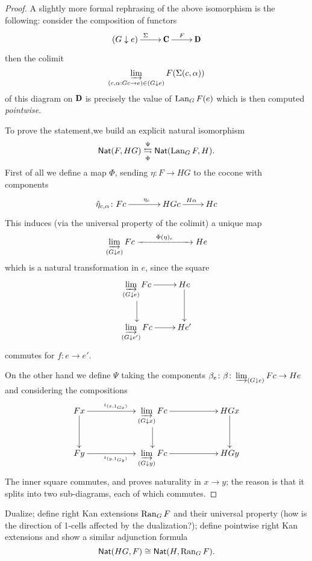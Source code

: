 \documentclass[a4paper,12pt]{amsart}
\begin{document}
\begin{proof}
A slightly more formal rephrasing of the above isomorphism is the following: consider the composition of functors
\[
\xymatrix{
	(G\downarrow e) \ar[r]^\Sigma & \C \ar[r]^F & \D
}
\]
then the colimit
\[
\varinjlim_{(c, \alpha : Gc \to e)\in(G\downarrow e)} F(\Sigma(c, \alpha))
\]
of this diagram on $\D$ is precisely the value of $\operatorname{Lan}_GF(e)$ which is then computed \emph{pointwise}.

To prove the statement,we build an explicit natural isomorphism
\[
\textsf{Nat}(F,HG)\overset{\Psi}{\underset{\Phi}\leftrightarrows} \textsf{Nat}(\operatorname{Lan}_GF,H).
\]
First of all we define a map $\Phi$, sending $\eta\colon F \to HG$ to the cocone with components
\[
\xymatrix{
	**[l] \hat{\eta}_{c,\alpha} \colon Fc \ar[r]^{\eta_c} & HGc \ar[r]^{H\alpha} & Hc
}
\]
This induces (via the universal property of the colimit) a unique map
\[
\varinjlim_{(G\downarrow e)} Fc \xrightarrow[]{\qquad \Phi(\eta)_e\qquad} He
\]
which is a natural transformation in $e$, since the square
\[
\xymatrix{
	\displaystyle \varinjlim_{(G\downarrow e)} Fc \ar[r]\ar[d]& He \ar[d]\\
	\displaystyle \varinjlim_{(G\downarrow e')} Fc \ar[r] & He'
}
\]
commutes for $f\colon e\to e'$.

On the other hand we define $\Psi$ taking the components $\beta_e \colon \beta\colon \varinjlim_{(G\downarrow e)} Fc \to He$ and considering the compositions
\[
\xymatrix@C=2cm{
	Fx\ar[r]^{\iota_{(x, 1_{Gx})}}\ar[d] & \displaystyle\varinjlim_{(G\downarrow x)} Fc \ar[r]\ar[d] & HGx \ar[d] \\
	Fy \ar[r]_{\iota_{(y, 1_{Gy})}}& \displaystyle\varinjlim_{(G\downarrow y)} Fc \ar[r] & HGy 
}
\]
The inner square commutes, and proves naturality in $x\to y$; the reason is that it splits into two sub-diagrams, each of which commutes.
\end{proof}
\begin{exercise}
Dualize; define right Kan extensions $\operatorname{Ran}_GF$ and their universal property (how is the direction of 1-cells affected by the dualization?); define pointwise right Kan extensions and show a similar adjunction formula
\[
\textsf{Nat}(HG,F)\cong \textsf{Nat}(H, \operatorname{Ran}_GF).
\]
\end{exercise}
\end{document}
